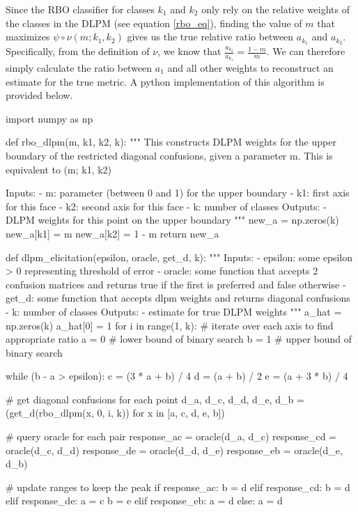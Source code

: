 \documentclass[
  letterpaper,
  DIV=11,
  numbers=noendperiod,
  oneside]{scrreprt}
\theoremstyle{remark}
\begin{document}
Since the RBO classifier for classes \(k_1\) and \(k_2\) only rely on
the relative weights of the classes in the DLPM (see equation
\hyperref[rbo_eq]{{[}rbo\_eq{]}}), finding the value of \(m\) that
maximizes \(\psi \circ \nu(m; k_1, k_2)\) gives us the true relative
ratio between \(a_{k_1}\) and \(a_{k_2}\). Specifically, from the
definition of \(\nu\), we know that
\(\frac{a_{k_2}}{a_{k_1}} = \frac{1-m}{m}\). We can therefore simply
calculate the ratio between \(a_1\) and all other weights to reconstruct
an estimate for the true metric. A python implementation of this
algorithm is provided below.

import numpy as np

def rbo\_dlpm(m, k1, k2, k): """ This constructs DLPM weights for the
upper boundary of the restricted diagonal confusions, given a parameter
m. This is equivalent to (m; k1, k2)

Inputs: - m: parameter (between 0 and 1) for the upper boundary - k1:
first axis for this face - k2: second axis for this face - k: number of
classes Outputs: - DLPM weights for this point on the upper boundary """
new\_a = np.zeros(k) new\_a{[}k1{]} = m new\_a{[}k2{]} = 1 - m return
new\_a

def dlpm\_elicitation(epsilon, oracle, get\_d, k): """ Inputs: -
epsilon: some epsilon \textgreater{} 0 representing threshold of error -
oracle: some function that accepts 2 confusion matrices and returns true
if the first is preferred and false otherwise - get\_d: some function
that accepts dlpm weights and returns diagonal confusions - k: number of
classes Outputs: - estimate for true DLPM weights """ a\_hat =
np.zeros(k) a\_hat{[}0{]} = 1 for i in range(1, k): \# iterate over each
axis to find appropriate ratio a = 0 \# lower bound of binary search b =
1 \# upper bound of binary search

while (b - a \textgreater{} epsilon): c = (3 * a + b) / 4 d = (a + b) /
2 e = (a + 3 * b) / 4

\# get diagonal confusions for each point d\_a, d\_c, d\_d, d\_e, d\_b =
(get\_d(rbo\_dlpm(x, 0, i, k)) for x in {[}a, c, d, e, b{]})

\# query oracle for each pair response\_ac = oracle(d\_a, d\_c)
response\_cd = oracle(d\_c, d\_d) response\_de = oracle(d\_d, d\_e)
response\_eb = oracle(d\_e, d\_b)

\# update ranges to keep the peak if response\_ac: b = d elif
response\_cd: b = d elif response\_de: a = c b = e elif response\_eb: a
= d else: a = d
\end{document}
